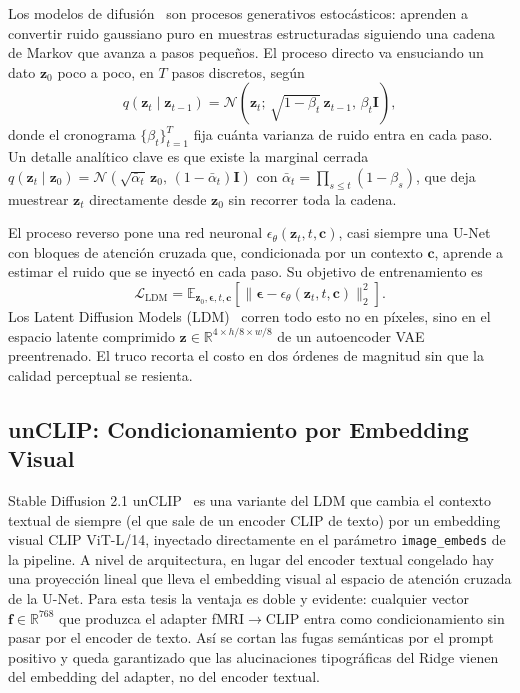 Los modelos de difusión~\cite{sohldickstein2015deep,ho2020ddpm} son procesos generativos 
estocásticos: aprenden a convertir ruido gaussiano puro en muestras estructuradas siguiendo una 
cadena de Markov que avanza a pasos pequeños. El proceso directo va ensuciando un dato 
$\mathbf{z}_0$ poco a poco, en $T$ pasos discretos, según
\begin{equation}
q(\mathbf{z}_t\mid\mathbf{z}_{t-1}) = \mathcal{N}\!\left(\mathbf{z}_t;\,\sqrt{1-\beta_t}\,\mathbf{z}_{t-1},\,\beta_t\mathbf{I}\right),
\end{equation}
donde el cronograma $\{\beta_t\}_{t=1}^{T}$ fija cuánta varianza de ruido entra en cada paso. 
Un detalle analítico clave es que existe la marginal cerrada 
$q(\mathbf{z}_t\mid\mathbf{z}_0) = \mathcal{N}(\sqrt{\bar{\alpha}_t}\,\mathbf{z}_0,\,(1-\bar{\alpha}_t)\mathbf{I})$ 
con $\bar{\alpha}_t = \prod_{s\leq t}(1-\beta_s)$, que deja muestrear $\mathbf{z}_t$ 
directamente desde $\mathbf{z}_0$ sin recorrer toda la cadena.

El proceso reverso pone una red neuronal $\epsilon_\theta(\mathbf{z}_t,t,\mathbf{c})$,
casi siempre una U-Net con bloques de atención cruzada que, condicionada por un contexto 
$\mathbf{c}$, aprende a estimar el ruido que se inyectó en cada paso. Su objetivo de 
entrenamiento es
\begin{equation}
\mathcal{L}_{\text{LDM}} = \mathbb{E}_{\mathbf{z}_0,\boldsymbol{\epsilon},t,\mathbf{c}}\!\left[\|\boldsymbol{\epsilon} - \epsilon_\theta(\mathbf{z}_t,t,\mathbf{c})\|_2^2\right].
\end{equation}
Los Latent Diffusion Models (LDM)~\cite{rombach2022high,rombach2022ldm} corren todo esto no en 
píxeles, sino en el espacio latente comprimido $\mathbf{z}\in\mathbb{R}^{4\times h/8\times w/8}$ 
de un autoencoder VAE preentrenado. El truco recorta el costo en dos órdenes de magnitud sin 
que la calidad perceptual se resienta.

\subsection{unCLIP: Condicionamiento por Embedding Visual}

Stable Diffusion 2.1 unCLIP~\cite{ramesh2022unclip,rombach2022high} es una variante del LDM que 
cambia el contexto textual de siempre (el que sale de un encoder CLIP de texto) por un embedding 
visual CLIP ViT-L/14, inyectado directamente en el parámetro \texttt{image\_embeds} de la pipeline.
A nivel de arquitectura, en lugar del encoder textual congelado hay una proyección lineal que 
lleva el embedding visual al espacio de atención cruzada de la U-Net. Para esta tesis la ventaja 
es doble y evidente: cualquier vector $\mathbf{f}\in\mathbb{R}^{768}$ que produzca el adapter 
fMRI$\rightarrow$CLIP entra como condicionamiento sin pasar por el encoder de texto. Así se 
cortan las fugas semánticas por el prompt positivo y queda garantizado que las alucinaciones 
tipográficas del Ridge vienen del embedding del adapter, no del encoder textual.

